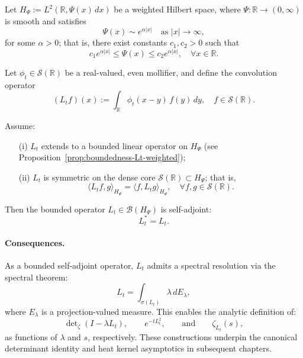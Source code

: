 \begin{proposition}
\label{prop:selfadjointness_Lt}
Let \( H_\Psi := L^2(\mathbb{R}, \Psi(x)\, dx) \) be a weighted Hilbert space, where \( \Psi \colon \mathbb{R} \to (0,\infty) \) is smooth and satisfies
\[
\Psi(x) \sim e^{\alpha|x|} \quad \text{as } |x| \to \infty,
\]
for some \( \alpha > 0 \); that is, there exist constants \( c_1, c_2 > 0 \) such that
\[
c_1 e^{\alpha |x|} \le \Psi(x) \le c_2 e^{\alpha |x|}, \quad \forall x \in \mathbb{R}.
\]

Let \( \phi_t \in \mathcal{S}(\mathbb{R}) \) be a real-valued, even mollifier, and define the convolution operator
\[
(L_t f)(x) := \int_{\mathbb{R}} \phi_t(x - y)\, f(y)\, dy, \quad f \in \mathcal{S}(\mathbb{R}).
\]

Assume:
\begin{itemize}
    \item[\textup{(i)}] \( L_t \) extends to a bounded linear operator on \( H_\Psi \) (see Proposition~\ref{prop:boundedness-Lt-weighted});
    \item[\textup{(ii)}] \( L_t \) is symmetric on the dense core \( \mathcal{S}(\mathbb{R}) \subset H_\Psi \); that is,
    \[
    \langle L_t f, g \rangle_{H_\Psi} = \langle f, L_t g \rangle_{H_\Psi}, \quad \forall f, g \in \mathcal{S}(\mathbb{R}).
    \]
\end{itemize}

Then the bounded operator \( L_t \in \mathcal{B}(H_\Psi) \) is self-adjoint:
\[
L_t^* = L_t.
\]

\paragraph{Consequences.}
As a bounded self-adjoint operator, \( L_t \) admits a spectral resolution via the spectral theorem:
\[
L_t = \int_{\sigma(L_t)} \lambda\, dE_\lambda,
\]
where \( E_\lambda \) is a projection-valued measure. This enables the analytic definition of:
\[
\det\nolimits_\zeta(I - \lambda L_t), \qquad e^{-t L_t^2}, \qquad \text{and} \qquad \zeta_{L_t}(s),
\]
as functions of \( \lambda \) and \( s \), respectively. These constructions underpin the canonical determinant identity and heat kernel asymptotics in subsequent chapters.
\end{proposition}

